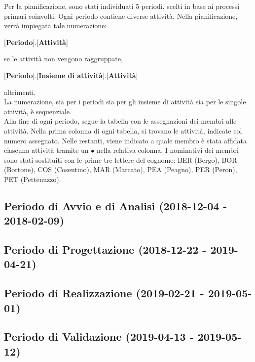 Per la pianificazione, sono stati individuati 5 periodi, scelti in base ai processi primari coinvolti. Ogni periodo contiene diverse attività. Nella pianificazione, verrà impiegata tale numerazione:
\begin{center}
	[\textbf{Periodo}].[\textbf{Attività}]
\end{center}
se le attività non vengono raggruppate,
\begin{center}
	[\textbf{Periodo}].[\textbf{Insieme di attività}].[\textbf{Attività}]
\end{center}
altrimenti.\\
La numerazione, sia per i periodi sia per gli insieme di attività sia per le singole attività, è sequenziale.\\
Alla fine di ogni periodo, segue la tabella con le assegnazioni dei membri alle attività. Nella prima colonna di ogni tabella, si trovano le attività, indicate col numero assegnato. Nelle restanti, viene indicato a quale membro è stata affidata ciascuna attività tramite un $\bullet$ nella relativa colonna. I nominativi dei membri sono stati sostituiti con le prime tre lettere del cognome: BER (Bergo), BOR (Bortone), COS (Cosentino), MAR (Marcato), PEA (Peagno), PER (Peron), PET (Pettenuzzo).

\newpage
\subsection{Periodo di Avvio e di Analisi (2018-12-04 - 2018-02-09)}
	

\newpage
\subsection{Periodo di Progettazione (2018-12-22 - 2019-04-21)}	
	
	
\newpage	
\subsection{Periodo di Realizzazione (2019-02-21 - 2019-05-01)}
	
	
\newpage	
\subsection{Periodo di Validazione (2019-04-13 - 2019-05-12)}
	
	
\newpage
